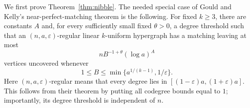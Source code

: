 \documentclass[11pt,a4paper]{amsart}
\theoremstyle{plain}
\theoremstyle{definition}
\theoremstyle{remark}
\begin{document}
We first prove Theorem~\ref{thm:nibble}. The needed special case of Gould and Kelly's
near-perfect-matching theorem \cite[Theorem 1.4]{GouldKelly} is the following. For fixed
$k\ge3$, there are constants $A$ and, for every sufficiently small fixed $\theta>0$, a
degree threshold such that an $(n,a,\varepsilon)$-regular linear $k$-uniform hypergraph
has a matching leaving at most
\begin{equation}
\label{eq:GK-leftover}
  n B^{-1+\theta}(\log a)^A
\end{equation}
vertices uncovered whenever
\[
  1\le B\le\min\{a^{1/(k-1)},1/\varepsilon\}.
\]
Here $(n,a,\varepsilon)$-regular means that every degree lies in
$[(1-\varepsilon)a,(1+\varepsilon)a]$. This follows from their theorem by putting all
codegree bounds equal to $1$; importantly, its degree threshold is independent of $n$.
\end{document}
